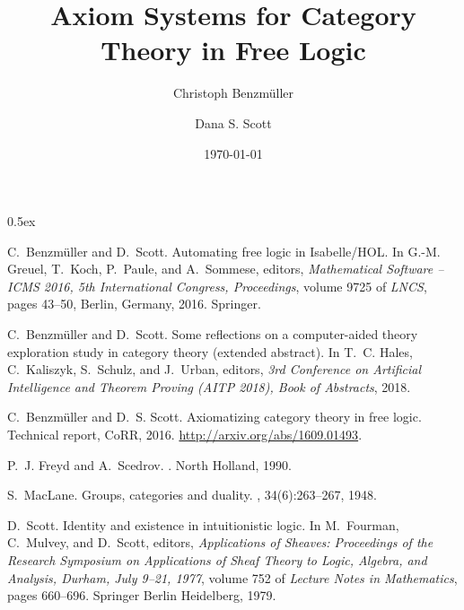 \documentclass[11pt,a4paper]{article}
\begin{document}
\title{Axiom Systems for Category Theory in Free Logic}
\author[1]{Christoph Benzm\"uller}
\author[2]{Dana S. Scott}
\date{\today}                     %
\setcounter{Maxaffil}{0}
\renewcommand\Affilfont{\itshape\small}

\maketitle

\tableofcontents

\parindent 0pt\parskip 0.5ex




% 

\begin{thebibliography}{1}

C.~Benzm{\"u}ller and D.~Scott.
\newblock Automating free logic in {Isabelle/HOL}.
\newblock In G.-M. Greuel, T.~Koch, P.~Paule, and A.~Sommese, editors, {\em
  Mathematical Software -- ICMS 2016, 5th International Congress, Proceedings},
  volume 9725 of {\em LNCS}, pages 43--50, Berlin, Germany, 2016. Springer.

C.~Benzm{\"u}ller and D.~Scott.
\newblock Some reflections on a computer-aided theory exploration study in
  category theory (extended abstract).
\newblock In T.~C. Hales, C.~Kaliszyk, S.~Schulz, and J.~Urban, editors, {\em
  3rd Conference on Artificial Intelligence and Theorem Proving (AITP 2018),
  Book of Abstracts}, 2018.

C.~Benzm{\"u}ller and D.~S. Scott.
\newblock Axiomatizing category theory in free logic.
\newblock Technical report, CoRR, 2016.
\newblock \url{http://arxiv.org/abs/1609.01493}.

P.~J. Freyd and A.~Scedrov.
.
\newblock North Holland, 1990.

S.~MacLane.
\newblock Groups, categories and duality.
,
  34(6):263--267, 1948.

D.~Scott.
\newblock Identity and existence in intuitionistic logic.
\newblock In M.~Fourman, C.~Mulvey, and D.~Scott, editors, {\em Applications of
  Sheaves: Proceedings of the Research Symposium on Applications of Sheaf
  Theory to Logic, Algebra, and Analysis, Durham, July 9--21, 1977}, volume 752
  of {\em Lecture Notes in Mathematics}, pages 660--696. Springer Berlin
  Heidelberg, 1979.

\end{thebibliography}
\end{document}
